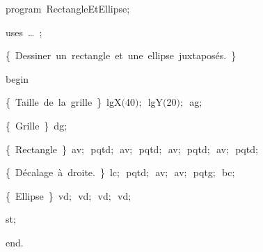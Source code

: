 
{
\parindent {}
\medskip

\carrenoir
\vspace{\neglskip}\mbox{\blc  \idt  \mcl program\idt \ RectangleEtEllipse$;$
}\par 
\vspace{\neglskip}\mbox{\blc \blk\idt \mcl uses\idt \ \ldots\ $;$
}\par 
\vspace{\neglskip}\mbox{\blc  \blk\idt  \cmt  \{\ Dessiner\ un\ rectangle\ et\ une\ ellipse\ juxtaposés.\ \}\idt }\par 
\vspace{\neglskip}\mbox{\blc  \idt  \mcl begin\idt }\par 
\vspace{\neglskip}\mbox{\blc  \blk\idt  \cmt  \{\ Taille\ de\ la\ grille\ \}\idt \ lgX$($40$)$$;$\ lgY$($20$)$$;$\ ag$;$}\par 
\vspace{\neglskip}\mbox{\blc  \blk\idt  \cmt  \{\ Grille\ \}\idt \ dg$;$}\par 
\vspace{\neglskip}\mbox{\blc  \blk\idt  \cmt  \{\ Rectangle\ \}\idt \ av$;$\ pqtd$;$\ av$;$\ pqtd$;$\ av$;$\ pqtd$;$\ av$;$\ pqtd$;$}\par 
\vspace{\neglskip}\mbox{\blc  \blk\idt  \cmt  \{\ Décalage\ à\ droite.\ \}\idt \ lc$;$\ pqtd$;$\ av$;$\ av$;$\ pqtg$;$\ bc$;$\ }\par 
\vspace{\neglskip}\mbox{\blc  \blk\idt  \cmt  \{\ Ellipse\ \}\idt \ vd$;$\ vd$;$\ vd$;$\ vd$;$\ }\par 
\vspace{\neglskip}\mbox{\blc  \blk\idt  st$;$}\par 
\vspace{\neglskip}\mbox{\blc  \idt  \mcl end\idt $.$}\par 

\medskip }

